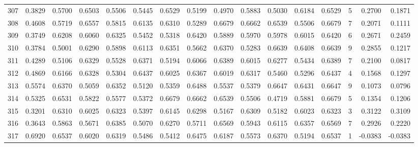 \begin{tabular}{lrrrrrrrrrrrrrrr}
307 &      0.3829 &  0.5700 &  0.6503 &  0.5506 &  0.5445 &  0.6529 &  0.5199 &  0.4970 &  0.5883 &  0.5030 &   0.6184 &     0.6529 &      5 &                    0.2700 &                     0.1871 \\
308 &      0.4608 &  0.5719 &  0.6557 &  0.5815 &  0.6135 &  0.6310 &  0.5289 &  0.6679 &  0.6662 &  0.6539 &   0.5506 &     0.6679 &      7 &                    0.2071 &                     0.1111 \\
309 &      0.3749 &  0.6208 &  0.6060 &  0.6325 &  0.5452 &  0.5318 &  0.6420 &  0.5889 &  0.5970 &  0.5978 &   0.6015 &     0.6420 &      6 &                    0.2671 &                     0.2459 \\
310 &      0.3784 &  0.5001 &  0.6290 &  0.5898 &  0.6113 &  0.6351 &  0.5662 &  0.6370 &  0.5283 &  0.6639 &   0.6408 &     0.6639 &      9 &                    0.2855 &                     0.1217 \\
311 &      0.4289 &  0.5106 &  0.6329 &  0.5528 &  0.6371 &  0.5194 &  0.6066 &  0.6389 &  0.6015 &  0.6277 &   0.5434 &     0.6389 &      7 &                    0.2100 &                     0.0817 \\
312 &      0.4869 &  0.6166 &  0.6328 &  0.5304 &  0.6437 &  0.6025 &  0.6367 &  0.6019 &  0.6317 &  0.5460 &   0.5296 &     0.6437 &      4 &                    0.1568 &                     0.1297 \\
313 &      0.5574 &  0.6370 &  0.5059 &  0.6352 &  0.5120 &  0.5359 &  0.6488 &  0.5537 &  0.5379 &  0.6647 &   0.6431 &     0.6647 &      9 &                    0.1073 &                     0.0796 \\
314 &      0.5325 &  0.6531 &  0.5822 &  0.5577 &  0.5372 &  0.6679 &  0.6662 &  0.6539 &  0.5506 &  0.4719 &   0.5881 &     0.6679 &      5 &                    0.1354 &                     0.1206 \\
315 &      0.3201 &  0.6310 &  0.6025 &  0.6323 &  0.5397 &  0.6145 &  0.6298 &  0.5167 &  0.6309 &  0.5182 &   0.6023 &     0.6323 &      3 &                    0.3122 &                     0.3109 \\
316 &      0.3643 &  0.5863 &  0.5671 &  0.6385 &  0.5070 &  0.6270 &  0.5711 &  0.6569 &  0.5943 &  0.6115 &   0.6357 &     0.6569 &      7 &                    0.2926 &                     0.2220 \\
317 &      0.6920 &  0.6537 &  0.6020 &  0.6319 &  0.5486 &  0.5412 &  0.6475 &  0.6187 &  0.5573 &  0.6370 &   0.5194 &     0.6537 &      1 &                   -0.0383 &                    -0.0383 \\

\end{tabular}
